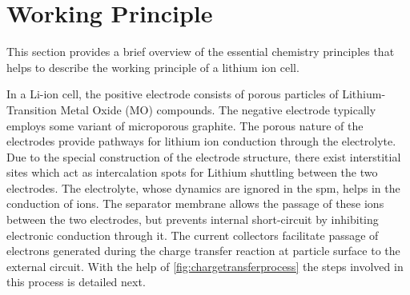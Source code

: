


\section{Working Principle}\label{subsec:liionchemistry}

This section  provides a  brief overview of  the essential  chemistry principles
that helps to describe the working principle of a lithium ion cell.

In  a Li-ion  cell,  the  positive electrode  consists  of  porous particles  of
Lithium-Transition Metal Oxide (MO)  compounds. The negative electrode typically
employs  some  variant  of  microporous  graphite.  The  porous  nature  of  the
electrodes provide pathways for lithium  ion conduction through the electrolyte.
Due  to  the  special  construction  of the  electrode  structure,  there  exist
interstitial  sites  which act  as  intercalation  spots for  Lithium  shuttling
between the two  electrodes. The electrolyte, whose dynamics are  ignored in the
\gls{spm}, helps  in the  conduction of   ions. The  separator membrane
allows  the passage  of  these ions  between the  two  electrodes, but  prevents
internal  short-circuit  by inhibiting  electronic  conduction  through it.  The
current collectors facilitate  passage of electrons generated  during the charge
transfer reaction  at particle surface  to the  external circuit. With  the help
of \cref{fig:chargetransferprocess}  the  steps  involved  in  this  process  is
detailed next.

